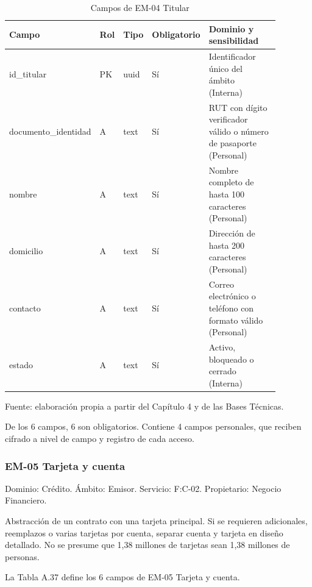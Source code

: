\documentclass[11pt]{article}
\begin{document}
\begin{table}[htbp]
\caption{Campos de EM-04 Titular}\label{tab:d_em04}
\centering
\begin{tabular}{@{}p{0.167\linewidth}p{0.070\linewidth}p{0.079\linewidth}p{0.097\linewidth}p{0.465\linewidth}@{}}
\toprule Campo & Rol & Tipo & Obligatorio & Dominio y sensibilidad \\
\midrule
id\_titular & PK & uuid & Sí & Identificador único del ámbito (Interna) \\
documento\_identidad & A & text & Sí & RUT con dígito verificador válido o número de pasaporte (Personal) \\
nombre & A & text & Sí & Nombre completo de hasta 100 caracteres (Personal) \\
domicilio & A & text & Sí & Dirección de hasta 200 caracteres (Personal) \\
contacto & A & text & Sí & Correo electrónico o teléfono con formato válido (Personal) \\
estado & A & text & Sí & Activo, bloqueado o cerrado (Interna) \\
\bottomrule
\end{tabular}
\par\smallskip
{\raggedright Fuente: elaboración propia a partir del Capítulo 4 y de las Bases Técnicas.\par}
\end{table}


De los 6 campos, 6 son obligatorios. Contiene 4 campos personales, que reciben cifrado a nivel de campo y registro de cada acceso.

\subsubsection{EM-05 Tarjeta y cuenta}

Dominio: Crédito. Ámbito: Emisor. Servicio: F:C-02. Propietario: Negocio Financiero.

Abstracción de un contrato con una tarjeta principal. Si se requieren adicionales, reemplazos o varias tarjetas por cuenta, separar cuenta y tarjeta en diseño detallado. No se presume que 1,38 millones de tarjetas sean 1,38 millones de personas.

La Tabla A.37 define los 6 campos de EM-05 Tarjeta y cuenta.
\end{document}
